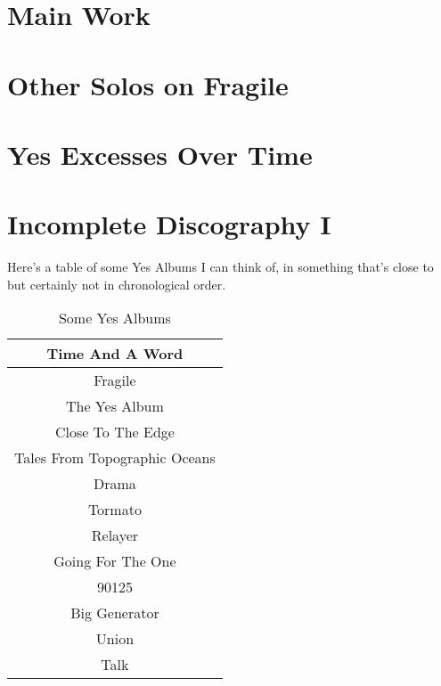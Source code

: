 \documentclass{easychithesis}
\begin{document}
\chapter{Main Work}

\chapter{Other Solos on Fragile}

\chapter{Yes Excesses Over Time}

%
%
\appendix
\chapter{Incomplete Discography I}
Here's a table of some Yes Albums I can think of, in something that's 
close to but certainly not in chronological order.
\begin{table}[h]
\begin{center}
\begin{tabular}{|c|}\hline
        Time And A Word\\
        \hline
        Fragile\\
        \hline
        The Yes Album\\
        \hline 
        Close To The Edge\\
        \hline 
        Tales From Topographic Oceans\\
        \hline
        Drama\\
        \hline
        Tormato\\
        \hline 
        Relayer\\
        \hline
        Going For The One\\
        \hline
        90125\\
        \hline 
        Big Generator\\
        \hline
        Union\\
        \hline 
        Talk\\
        \hline
\end{tabular}
\caption{Some Yes Albums}
\end{center}
\end{table}
\end{document}
